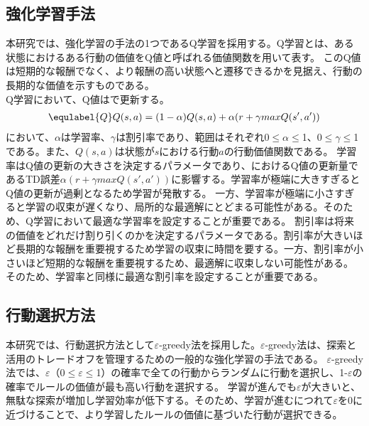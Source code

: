 \subsection{強化学習手法}
本研究では、強化学習の手法の1つであるQ学習を採用する。Q学習とは、ある状態におけるある行動の価値をQ値と呼ばれる価値関数を用いて表す。
このQ値は短期的な報酬でなく、より報酬の高い状態へと遷移できるかを見据え、行動の長期的な価値を示すものである。\\
Q学習において、Q値はで更新する。\\
\begin{eqnarray}
  \equlabel{Q}
  Q(s,a)=(1-\alpha)Q(s,a)+\alpha(r+\gamma maxQ(s',a'))
\end{eqnarray}
において、$\alpha$は学習率、$\gamma$は割引率であり、範囲はそれぞれ0$\leq$$\alpha$$\leq$1、0$\leq$$\gamma$$\leq$1である。また、$Q(s,a)$は状態が$s$における行動$a$の行動価値関数である。
学習率はQ値の更新の大きさを決定するパラメータであり、におけるQ値の更新量であるTD誤差$\alpha(r+\gamma maxQ(s',a'))$に影響する。学習率が極端に大きすぎるとQ値の更新が過剰となるため学習が発散する。
一方、学習率が極端に小さすぎると学習の収束が遅くなり、局所的な最適解にとどまる可能性がある。そのため、Q学習において最適な学習率を設定することが重要である。
割引率は将来の価値をどれだけ割り引くのかを決定するパラメータである。割引率が大きいほど長期的な報酬を重要視するため学習の収束に時間を要する。一方、割引率が小さいほど短期的な報酬を重要視するため、最適解に収束しない可能性がある。
そのため、学習率と同様に最適な割引率を設定することが重要である。
\subsection{行動選択方法}
本研究では、行動選択方法として$\varepsilon$-greedy法を採用した。$\varepsilon$-greedy法は、探索と活用のトレードオフを管理するための一般的な強化学習の手法である。
$\varepsilon$-greedy法では、$\varepsilon$（0$\leq$$\varepsilon$$\leq$1）の確率で全ての行動からランダムに行動を選択し、1-$\varepsilon$の確率でルールの価値が最も高い行動を選択する。
学習が進んでも$\varepsilon$が大きいと、無駄な探索が増加し学習効率が低下する。そのため、学習が進むにつれて$\varepsilon$を0に近づけることで、より学習したルールの価値に基づいた行動が選択できる。


